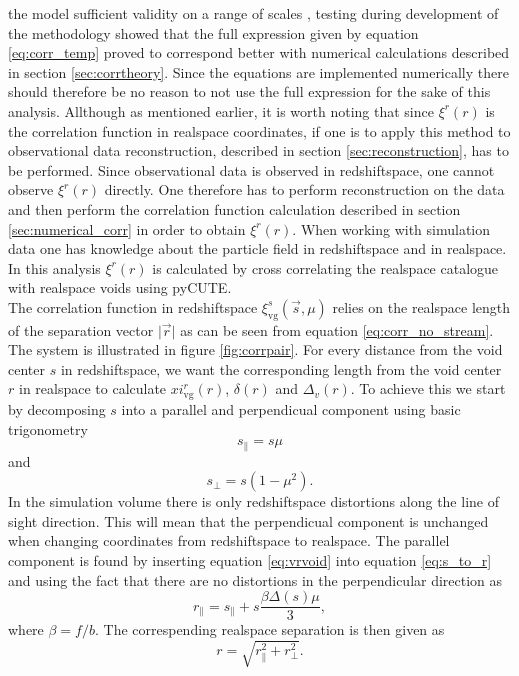 the model sufficient validity on a range of scales \cite{BeyondBAO}, testing during development of the methodology showed that the full expression given by equation \ref{eq:corr_temp} proved to correspond better with numerical calculations described in section \ref{sec:corrtheory}. Since the equations are implemented numerically there should therefore be no reason to not use the full expression for the sake of this analysis. Allthough 
as mentioned earlier, it is worth noting that since $\xi^r(r)$ is the correlation function in
realspace coordinates, if one is to apply this method to observational data
reconstruction, described in section \ref{sec:reconstruction}, has to be performed. Since observational data is observed in
redshiftspace, one cannot observe $\xi^r(r)$ directly. One therefore has to
perform reconstruction on the data and then perform the correlation function
calculation described in section \ref{sec:numerical_corr} in order to obtain
$\xi^r(r)$. When working with simulation data one has knowledge about the
particle field in redshiftspace and in realspace. In this analysis $\xi^r(r)$ is calculated by cross correlating the realspace catalogue with realspace voids using pyCUTE. 
\\\indent
The correlation function in redshiftspace $\xi^s_{\mathrm{vg}}(\vec{s},\mu)$
relies on the realspace length of the separation vector $\vert\vec{r}\vert$ as
can be seen from equation \ref{eq:corr_no_stream}. The system is illustrated in
figure \ref{fig:corrpair}. For every distance from the void center $s$ in
redshiftspace, we want the corresponding length from the void center $r$ in
realspace to calculate $xi^r_{\mathrm{vg}}(r)$, $\delta(r)$ and $\Delta_v(r)$.
To achieve this we start by decomposing $s$ into a parallel and perpendicual
component using basic trigonometry
\begin{equation}
    s_\parallel=s\mu
\end{equation}
and
\begin{equation}
    s_\perp=s(1-\mu^2).
\end{equation}
In the simulation volume there is only redshiftspace distortions along the line
of sight direction. This will mean that the perpendicual component is unchanged
when changing coordinates from redshiftspace to realspace. The parallel
component is found by inserting equation \ref{eq:vrvoid} into equation \ref{eq:s_to_r} and using the fact that there are no distortions in the perpendicular direction as
\begin{equation}
    r_\parallel=s_\parallel + s\frac{\beta\Delta(s)\mu}{3},
\end{equation}
where $\beta=f/b$.
The correspending realspace separation is then given as
\begin{equation}
    r=\sqrt{r_\parallel^2+r_\perp^2}.
\end{equation}
